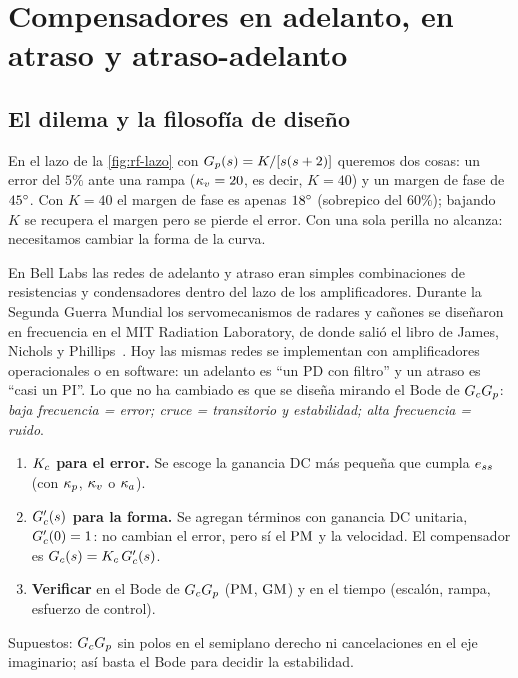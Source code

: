 \section{Compensadores en adelanto, en atraso y atraso-adelanto}
\label{sec:rf-compensadores}

\subsection{El dilema y la filosofía de diseño}

En el lazo de la \cref{fig:rf-lazo} con $G_p(s)=K/[s(s+2)]$ queremos dos cosas: un error del $5\%$ ante una rampa ($\kappa_v=20$, es decir, $K=40$) y un margen de fase de $45^{\circ}$. Con $K=40$ el margen de fase es apenas $18^{\circ}$ (sobrepico del $60\%$); bajando $K$ se recupera el margen pero se pierde el error. Con una sola perilla no alcanza: necesitamos cambiar la forma de la curva.

\begin{historia}
En Bell Labs las redes de adelanto y atraso eran simples combinaciones de resistencias y condensadores dentro del lazo de los amplificadores. Durante la Segunda Guerra Mundial los servomecanismos de radares y cañones se diseñaron en frecuencia en el MIT Radiation Laboratory, de donde salió el libro de James, Nichols y Phillips~\citep{JaNiPh47}. Hoy las mismas redes se implementan con amplificadores operacionales o en software: un adelanto es ``un PD con filtro'' y un atraso es ``casi un PI''. Lo que no ha cambiado es que se diseña mirando el Bode de $G_cG_p$: \emph{baja frecuencia = error; cruce = transitorio y estabilidad; alta frecuencia = ruido}.
\end{historia}

\begin{receta}
\begin{enumerate}
  \item \textbf{$K_c$ para el error.} Se escoge la ganancia DC más pequeña que cumpla $e_{ss}$ (con $\kappa_p$, $\kappa_v$ o $\kappa_a$).
  \item \textbf{$G_c'(s)$ para la forma.} Se agregan términos con ganancia DC unitaria, $G_c'(0)=1$: no cambian el error, pero sí el $\mathrm{PM}$ y la velocidad. El compensador es $G_c(s)=K_c\,G_c'(s)$.
  \item \textbf{Verificar} en el Bode de $G_cG_p$ ($\mathrm{PM}$, $\mathrm{GM}$) y en el tiempo (escalón, rampa, esfuerzo de control).
\end{enumerate}
Supuestos: $G_cG_p$ sin polos en el semiplano derecho ni cancelaciones en el eje imaginario; así basta el Bode para decidir la estabilidad.
\end{receta}

